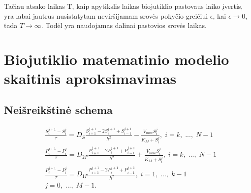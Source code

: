 \documentclass[12pt, a4paper, lithuanian]{article}
\begin{document}
Tačiau atsako laikas T, kaip apytikslis laikas biojutiklio pastovaus laiko
įvertis, yra labai jautrus nusistatytam neviršijamam srovės pokyčio greičiui
$\epsilon$, kai $\epsilon \to 0$, tada $T \to \infty$. Todėl yra naudojamas
dalinai pastovios srovės laikas.  
 
\section{Biojutiklio matematinio modelio skaitinis aproksimavimas}
\subsection{Neišreikštinė schema}

\begin{equation}
\begin{aligned} 
    &\frac{S_i^{j+1} - S_i^j}{\tau} = D_S\frac{S_{i+1}^{j+1} -
    2S_i^{j+1} + S_{i-1}^{j+1}}{h^2} -
    \frac{V_{max} S_i^j}{K_M + S_i^j},\;i = k,\;...,\;N-1\\ 
    &\frac{P_i^{j+1} - P_i^j}{\tau} = D_{2P}\frac{P_{i+1}^{j+1} -
    2P_i^{j+1} + P_{i-1}^{j+1}}{h^2} +
    \frac{V_{max} S_i^j}{K_M + S_i^j},\;i = k,\;...,\;N-1\\ 
    &\frac{P_i^{j+1} - P_i^j}{\tau} = D_{1P}\frac{P_{i+1}^{j+1} -
    2P_i^{j+1} + P_{i-1}^{j+1}}{h^2}, \;i = 1,\;...,\;k-1\\ 
    &j=0,\;...,\;M-1.
\end{aligned}
\end{equation}

% 
% 
% 
% 
\end{document}
